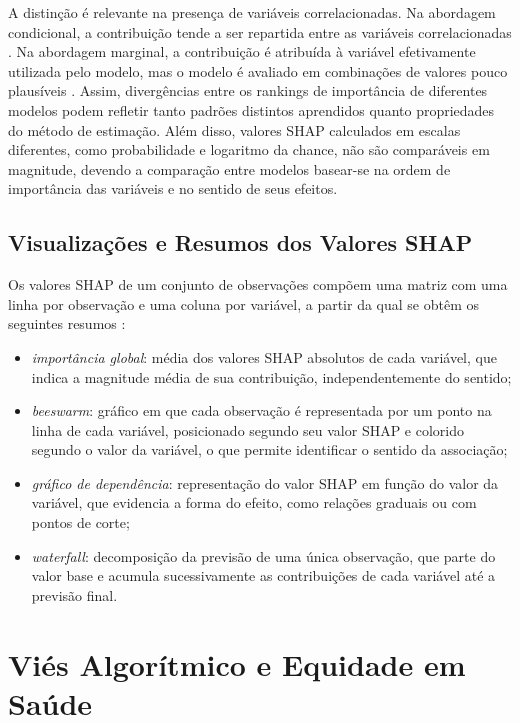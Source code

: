A distinção é relevante na presença de variáveis correlacionadas. Na abordagem condicional, a contribuição tende a ser repartida entre as variáveis correlacionadas \cite{Chen2023Algorithms, Aas2021Explaining}. Na abordagem marginal, a contribuição é atribuída à variável efetivamente utilizada pelo modelo, mas o modelo é avaliado em combinações de valores pouco plausíveis \cite{Chen2020TrueToModel}. Assim, divergências entre os rankings de importância de diferentes modelos podem refletir tanto padrões distintos aprendidos quanto propriedades do método de estimação. Além disso, valores SHAP calculados em escalas diferentes, como probabilidade e logaritmo da chance, não são comparáveis em magnitude, devendo a comparação entre modelos basear-se na ordem de importância das variáveis e no sentido de seus efeitos.

\subsection{Visualizações e Resumos dos Valores SHAP}
\label{sec:fund_visualizacoes}

Os valores SHAP de um conjunto de observações compõem uma matriz com uma linha por observação e uma coluna por variável, a partir da qual se obtêm os seguintes resumos \cite{Mayer2026shapviz}:

\begin{itemize}
    \item \textit{importância global}: média dos valores SHAP absolutos de cada variável, que indica a magnitude média de sua contribuição, independentemente do sentido;
    \item \textit{beeswarm}: gráfico em que cada observação é representada por um ponto na linha de cada variável, posicionado segundo seu valor SHAP e colorido segundo o valor da variável, o que permite identificar o sentido da associação;
    \item \textit{gráfico de dependência}: representação do valor SHAP em função do valor da variável, que evidencia a forma do efeito, como relações graduais ou com pontos de corte;
    \item \textit{waterfall}: decomposição da previsão de uma única observação, que parte do valor base e acumula sucessivamente as contribuições de cada variável até a previsão final.
\end{itemize}

\section{Viés Algorítmico e Equidade em Saúde}
\label{sec:fund_vies}

